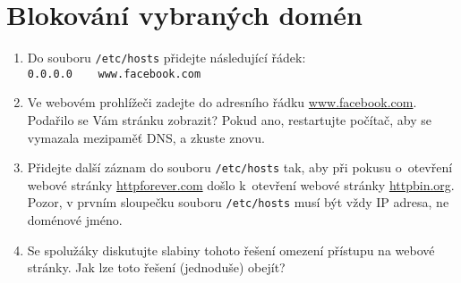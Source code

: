 \section{Blokování vybraných domén}
\begin{enumerate}
	\item Do souboru \texttt{/etc/hosts} přidejte následující řádek:\\
    \verb|0.0.0.0    www.facebook.com|
    \item Ve webovém prohlížeči zadejte do adresního řádku \url{www.facebook.com}. Podařilo se Vám stránku zobrazit? Pokud ano, restartujte počítač, aby se vymazala mezipaměť DNS, a zkuste znovu.
    \item Přidejte další záznam do souboru \texttt{/etc/hosts} tak, aby při pokusu o~otevření webové stránky \url{httpforever.com} došlo k~otevření webové stránky \url{httpbin.org}. Pozor, v prvním sloupečku souboru \texttt{/etc/hosts} musí být vždy IP adresa, ne doménové jméno.
    \item Se spolužáky diskutujte slabiny tohoto řešení omezení přístupu na webové stránky. Jak lze toto řešení (jednoduše) obejít?
\end{enumerate}

